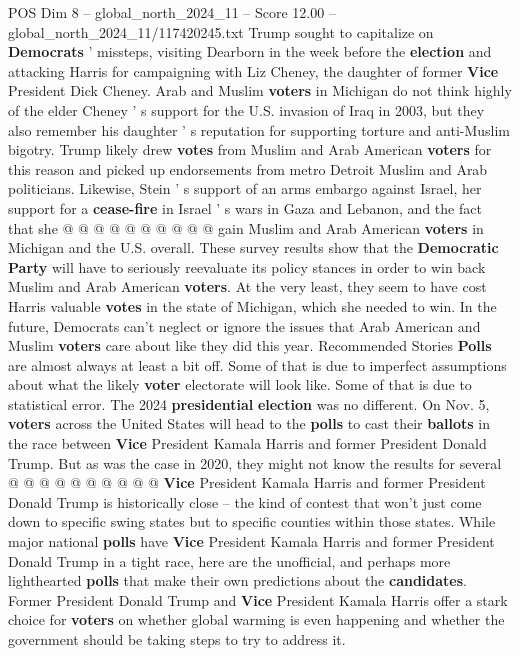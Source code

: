 \begin{textsample}{POS Dim 8 – global\_north\_2024\_11 – Score 12.00 – global\_north\_2024\_11/117420245.txt}
Trump sought to capitalize on \textbf{Democrats} ' missteps, visiting Dearborn in the week before the \textbf{election} and attacking Harris for campaigning with Liz Cheney, the daughter of former \textbf{Vice} President Dick Cheney.
Arab and Muslim \textbf{voters} in Michigan do not think highly of the elder Cheney ' s support for the U.S. invasion of Iraq in 2003, but they also remember his daughter ' s reputation for supporting torture and anti-Muslim bigotry.
Trump likely drew \textbf{votes} from Muslim and Arab American \textbf{voters} for this reason and picked up endorsements from metro Detroit Muslim and Arab politicians.
Likewise, Stein ' s support of an arms embargo against Israel, her support for a \textbf{cease-fire} in Israel ' s wars in Gaza and Lebanon, and the fact that she @ @ @ @ @ @ @ @ @ @ gain Muslim and Arab American \textbf{voters} in Michigan and the U.S. overall.
These survey results show that the \textbf{Democratic} \textbf{Party} will have to seriously reevaluate its policy stances in order to win back Muslim and Arab American \textbf{voters}.
At the very least, they seem to have cost Harris valuable \textbf{votes} in the state of Michigan, which she needed to win.
In the future, Democrats can't neglect or ignore the issues that Arab American and Muslim \textbf{voters} care about like they did this year.
Recommended Stories \textbf{Polls} are almost always at least a bit off.
Some of that is due to imperfect assumptions about what the likely \textbf{voter} electorate will look like.
Some of that is due to statistical error.
The 2024 \textbf{presidential} \textbf{election} was no different.
On Nov. 5, \textbf{voters} across the United States will head to the \textbf{polls} to cast their \textbf{ballots} in the race between \textbf{Vice} President Kamala Harris and former President Donald Trump.
But as was the case in 2020, they might not know the results for several @ @ @ @ @ @ @ @ @ @ \textbf{Vice} President Kamala Harris and former President Donald Trump is historically close -- the kind of contest that won't just come down to specific swing states but to specific counties within those states.
While major national \textbf{polls} have \textbf{Vice} President Kamala Harris and former President Donald Trump in a tight race, here are the unofficial, and perhaps more lighthearted \textbf{polls} that make their own predictions about the \textbf{candidates}.
Former President Donald Trump and \textbf{Vice} President Kamala Harris offer a stark choice for \textbf{voters} on whether global warming is even happening and whether the government should be taking steps to try to address it.

\end{textsample}
